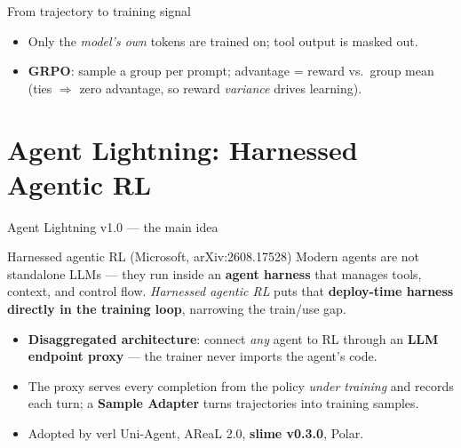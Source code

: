 \documentclass[aspectratio=169]{beamer}
\begin{document}
\begin{frame}{From trajectory to training signal}
  \begin{center}
  \end{center}
  \begin{itemize}\setlength\itemsep{0.2em}
    \item Only the \emph{model's own} tokens are trained on; tool output is masked out.
    \item \textbf{GRPO}: sample a group per prompt; advantage = reward vs.\ group mean
      (ties $\Rightarrow$ zero advantage, so reward \emph{variance} drives learning).
  \end{itemize}
\end{frame}

\section{Agent Lightning: Harnessed Agentic RL}

\begin{frame}{Agent Lightning v1.0 --- the main idea}
  \begin{block}{Harnessed agentic RL (Microsoft, arXiv:2608.17528)}
    Modern agents are not standalone LLMs --- they run inside an \textbf{agent harness}
    that manages tools, context, and control flow. \emph{Harnessed agentic RL} puts that
    \textbf{deploy-time harness directly in the training loop}, narrowing the train/use gap.
  \end{block}
  \begin{itemize}\setlength\itemsep{0.25em}
    \item \textbf{Disaggregated architecture}: connect \emph{any} agent to RL through an
      \textbf{LLM endpoint proxy} --- the trainer never imports the agent's code.
    \item The proxy serves every completion from the policy \emph{under training} and records
      each turn; a \textbf{Sample Adapter} turns trajectories into training samples.
    \item Adopted by verl Uni-Agent, AReaL 2.0, \textbf{slime v0.3.0}, Polar.
  \end{itemize}
\end{frame}
\end{document}
